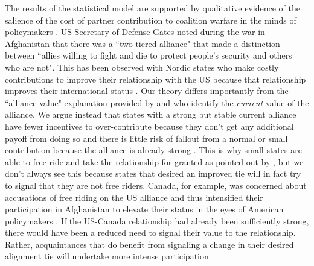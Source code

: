 \documentclass[12pt,letterpaper]{article}
\begin{document}
		The results of the statistical model are supported by qualitative evidence of the salience of the cost of partner contribution to coalition warfare in the minds of policymakers \citep[328]{ringsmose_natoburdensharingredux_2010}. US Secretary of Defense Gates noted during the war in Afghanistan that there was a ``two-tiered alliance" that made a distinction between ``allies willing to fight and die to protect people's security and others who are not". This has been observed with Nordic states who make costly contributions to improve their relationship with the US because that relationship improves their international status \citep{pedersen_bandwagonstatuschanging_2018}. Our theory differs importantly from the ``alliance value" explanation provided by \citet{davidson_americaallieswar_2011} and \citet{massie_democraticalliesfollowership_2016} who identify the \textit{current} value of the alliance. We argue instead that states with a strong but stable current alliance have fewer incentives to over-contribute because they don't get any additional payoff from doing so and there is little risk of fallout from a normal or small contribution because the alliance is already strong \citep{davidson_headingexitsdemocratic_2014}. This is why small states are able to free ride and take the relationship for granted as pointed out by \citet{keohane_biginfluencesmall_1971}, but we don't always see this because states that desired an improved tie will in fact try to signal that they are not free riders. Canada, for example, was concerned about accusations of free riding on the US alliance and thus intensified their participation in Afghanistan to elevate their status in the eyes of American policymakers \citep{massie_alliancevaluestatus_2018}. If the US-Canada relationship had already been sufficiently strong, there would have been a reduced need to signal their value to the relationship. Rather, acquaintances that do benefit from signaling a change in their desired alignment tie will undertake more intense participation \citep{gibler_priorcommitmentscompatible_2004, gartzke_contractsfriendsalliances_2012}.		
		
\end{document}
